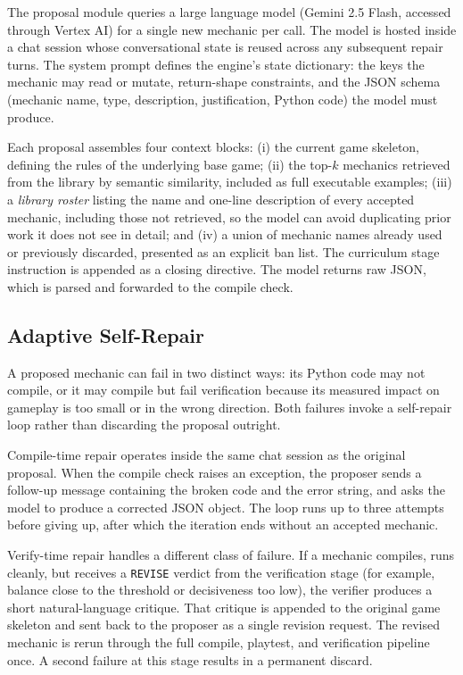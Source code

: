 \documentclass[conference]{IEEEtran}
\begin{document}
The proposal module queries a large language model (Gemini 2.5 Flash, accessed through Vertex AI) for a single new mechanic per call. The model is hosted inside a chat session whose conversational state is reused across any subsequent repair turns. The system prompt defines the engine's state dictionary: the keys the mechanic may read or mutate, return-shape constraints, and the JSON schema (mechanic name, type, description, justification, Python code) the model must produce.

Each proposal assembles four context blocks: (i) the current game skeleton, defining the rules of the underlying base game; (ii) the top-$k$ mechanics retrieved from the library by semantic similarity, included as full executable examples; (iii) a \emph{library roster} listing the name and one-line description of every accepted mechanic, including those not retrieved, so the model can avoid duplicating prior work it does not see in detail; and (iv) a union of mechanic names already used or previously discarded, presented as an explicit ban list. The curriculum stage instruction is appended as a closing directive. The model returns raw JSON, which is parsed and forwarded to the compile check.

\subsection{Adaptive Self-Repair}

A proposed mechanic can fail in two distinct ways: its Python code may not compile, or it may compile but fail verification because its measured impact on gameplay is too small or in the wrong direction. Both failures invoke a self-repair loop rather than discarding the proposal outright.

Compile-time repair operates inside the same chat session as the original proposal. When the compile check raises an exception, the proposer sends a follow-up message containing the broken code and the error string, and asks the model to produce a corrected JSON object. The loop runs up to three attempts before giving up, after which the iteration ends without an accepted mechanic.

Verify-time repair handles a different class of failure. If a mechanic compiles, runs cleanly, but receives a \texttt{REVISE} verdict from the verification stage (for example, balance close to the threshold or decisiveness too low), the verifier produces a short natural-language critique. That critique is appended to the original game skeleton and sent back to the proposer as a single revision request. The revised mechanic is rerun through the full compile, playtest, and verification pipeline once. A second failure at this stage results in a permanent discard.
\end{document}
